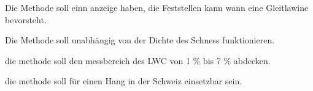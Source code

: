 Die Methode soll einn anzeige haben, die Feststellen kann wann eine Gleitlawine bevorsteht.

Die Methode soll unabhängig von der Dichte des Schness funktionieren.

die methode soll den messbereich des LWC von 1 \% bis 7 \% abdecken.

die methode soll für einen Hang in der Schweiz einsetzbar sein.
